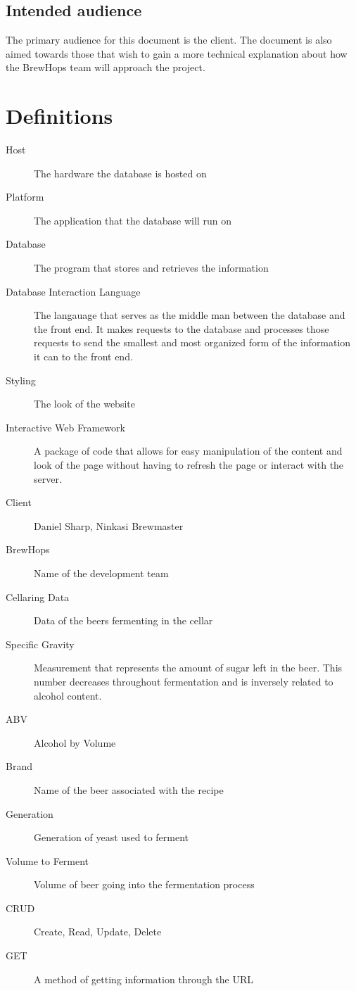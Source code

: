 \documentclass[draftclsnofoot,onecolumn,letterpaper,10pt]{IEEEtran}
\begin{document}
	\subsection{Intended audience}
	The primary audience for this document is the client.
	The document is also aimed towards those that wish to gain a more technical explanation about how the BrewHops team will approach the project.

\section{Definitions}
	\begin{description}
		\item[Host] The hardware the database is hosted on
		\item[Platform] The application that the database will run on
		\item[Database] The program that stores and retrieves the information
		\item[Database Interaction Language] The langauage that serves as the middle man between the database and the front end. It makes requests to the database and processes those requests to send the smallest and most organized form of the information it can to the front end.
		\item[Styling] The look of the website
		\item[Interactive Web Framework] A package of code that allows for easy manipulation of the content and look of the page without having to refresh the page or interact with the server.
		\item[Client] Daniel Sharp, Ninkasi Brewmaster
		\item[BrewHops] Name of the development team
		\item[Cellaring Data] Data of the beers fermenting in the cellar
		\item[Specific Gravity] Measurement that represents the amount of sugar left in the beer. This number decreases throughout fermentation and is inversely related to alcohol content.
		\item[ABV] Alcohol by Volume
		\item[Brand] Name of the beer associated with the recipe
		\item[Generation] Generation of yeast used to ferment
		\item[Volume to Ferment] Volume of beer going into the fermentation process
		\item[CRUD] Create, Read, Update, Delete
		\item[GET] A method of getting information through the URL

\end{description}
\end{document}
